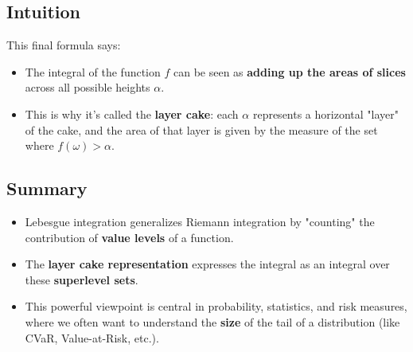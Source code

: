 \documentclass[11pt]{amsart}
\begin{document}
\subsection*{Intuition}

This final formula says:
\begin{itemize}
	\item The integral of the function $f$ can be seen as \textbf{adding up the areas of slices} across all possible heights $\alpha$.
	\item This is why it's called the \textbf{layer cake}: each $\alpha$ represents a horizontal "layer" of the cake, and the area of that layer is given by the measure of the set where $f(\omega) > \alpha$.
\end{itemize}

\subsection*{Summary}
\begin{itemize}
	\item Lebesgue integration generalizes Riemann integration by "counting" the contribution of \textbf{value levels} of a function.
	\item The \textbf{layer cake representation} expresses the integral as an integral over these \textbf{superlevel sets}.
	\item This powerful viewpoint is central in probability, statistics, and risk measures, where we often want to understand the \textbf{size} of the tail of a distribution (like CVaR, Value-at-Risk, etc.).
\end{itemize}

\end{document}

